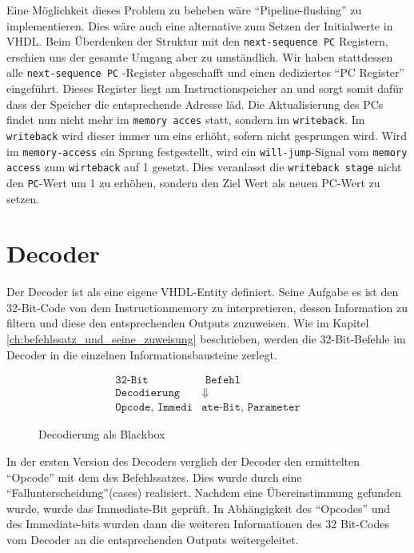 \documentclass[paper=a4,fontsize=11pt,twocolumn]{scrreprt}
\begin{document}
Eine Möglichkeit dieses Problem zu beheben wäre \enquote{Pipeline-flushing} zu implementieren.
Dies wäre auch eine alternative zum Setzen der Initialwerte in VHDL.
Beim Überdenken der Struktur mit den \texttt{next-sequence PC} Registern, erschien uns der gesamte Umgang aber zu umständlich.
Wir haben stattdessen alle \texttt{next-sequence PC} -Register abgeschafft und einen dediziertes \enquote{PC Register} eingeführt.
Dieses Register liegt am Instructionspeicher an und sorgt somit dafür dass der Speicher die entsprechende Adresse läd.
Die Aktualisierung des PCs findet nun nicht mehr im \texttt{memory acces} statt, sondern im \texttt{writeback}.
Im \texttt{writeback} wird dieser immer um eins erhöht, sofern nicht gesprungen wird.
Wird im \texttt{memory-access} ein Sprung festgestellt, wird ein \texttt{will-jump}-Signal vom \texttt{memory access} zum \texttt{wirteback} auf 1 gesetzt.
Dies veranlasst die \texttt{writeback stage} nicht den \texttt{PC}-Wert um 1 zu erhöhen, sondern den Ziel  Wert als neuen PC-Wert zu setzen.

\section{Decoder}
\label{sec:decoder}

Der Decoder ist als eine eigene VHDL-Entity definiert.
Seine Aufgabe es ist den 32-Bit-Code von dem Instructionmemory zu interpretieren, dessen Information zu filtern und diese den entsprechenden Outputs zuzuweisen.
Wie im Kapitel \ref{ch:befehlssatz_und_seine_zuweisung} beschrieben, werden die 32-Bit-Befehle im Decoder in die einzelnen Informationsbausteine zerlegt.

\begin{figure}[ht]
\centering
\begin{align*}
\texttt{32-Bit} & \texttt{ Befehl}\\
\texttt{Decodierung} & \Downarrow \\
\texttt{Opcode, Immedi} & \texttt{ate-Bit, Parameter}
\end{align*}
\caption{Decodierung als Blackbox}
\label{fig:Decodierung_blackbox}
\end{figure}

In der ersten Version des Decoders verglich der Decoder den ermittelten \enquote{Opcode} mit dem des Befehlssatzes.
Dies wurde durch eine \enquote{Fallunterscheidung}(cases) realisiert.
Nachdem eine Übereinstimmung gefunden wurde, wurde das Immediate-Bit geprüft.
In Abhängigkeit des \enquote{Opcodes} und des Immediate-bits wurden dann die weiteren Informationen des 32 Bit-Codes vom Decoder an die entsprechenden Outputs weitergeleitet.
\end{document}
